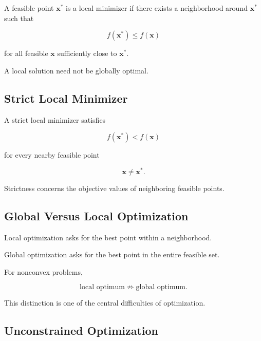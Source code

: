 A feasible point \(\mathbf{x}^*\) is a local minimizer if there exists a
neighborhood around \(\mathbf{x}^*\) such that

\[
\boxed{
f(\mathbf{x}^*)
\leq
f(\mathbf{x})
}
\]

for all feasible \(\mathbf{x}\) sufficiently close to
\(\mathbf{x}^*\).

A local solution need not be globally optimal.

\subsection{Strict Local Minimizer}
\label{subsec:strict-local-minimizer}

A strict local minimizer satisfies

\[
\boxed{
f(\mathbf{x}^*)
<
f(\mathbf{x})
}
\]

for every nearby feasible point

\[
\mathbf{x}\neq\mathbf{x}^*.
\]

Strictness concerns the objective values of neighboring feasible points.

\subsection{Global Versus Local Optimization}
\label{subsec:global-versus-local-optimization}

Local optimization asks for the best point within a neighborhood.

Global optimization asks for the best point in the entire feasible set.

For nonconvex problems,

\[
\boxed{
\text{local optimum}
\not\Rightarrow
\text{global optimum}.
}
\]

This distinction is one of the central difficulties of optimization.

\subsection{Unconstrained Optimization}
\label{subsec:unconstrained-optimization}

